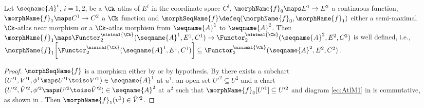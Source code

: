 \documentclass{article}
\begin{document}
\begin{lemma}
Let $\seqname{A}^i$, $i=1,2$, be a $\Ck$-atlas of $E^i$ in the
coordinate space $C^i$, $\morphName{f}_0 \maps E^1 \to E^2$ a continuous
function, $\morphName{f}_1 \maps C^1 \to C^2$ a $\Ck$ function and
$\morphSeqName{f} \defeq (\morphName{f}_0, \morphName{f}_1)$ either a
semi-maximal $\Ck$-atlas near morphism or a $\Ck$-atlas morphism from
$\seqname{A}^1$ to $\seqname{A}^2$. Then
$
  \morphName{f}_1
  \maps
  \Functor^{\minimal{\Ck}}_2 (\seqname{A}^1, E^1, C^1)
  \to
  \Functor^{\minimal{\Ck}}_2 (\seqname{A}^2, E^2, C^2)
$
is well defined, i.e.,
$
  \morphName{f}_1
    \biggl [
      \Functor^{\minimal{\Ck}}_2
        (\seqname{A}^1, E^1, C^1)
    \biggr ]
  \subseteq
      \Functor^{\minimal{\Ck}}_2
        (\seqname{A}^2, E^2, C^2)
$.

\begin{proof}
$\morphSeqName{f}$ is a morphism either by  or
by hypothesis. By  there exists a subchart
$
  (U'^1, V'^1, \phi^1 \maps U'^1 \toiso V'^1)
  \in \seqname{A}^1
$
at $u^1$, an open set $U'^2 \subseteq U^2$ and a chart
$
  (U'^2 ,\hat{V}'^2, \phi'^2 \maps U'^2 \toiso \hat{V}'^2)
  \in \seqname{A}^2
$
at $u^2$ such that
$\morphName{f}_0[U'^1] \subseteq U'^2$ and diagram \eqref{eq:AtlM1} in
 is commutative, as shown in
. Then $\morphName{f}_1 (v^1) \in \hat{V}'^2$.
\end{proof}
\end{lemma}
\end{document}
